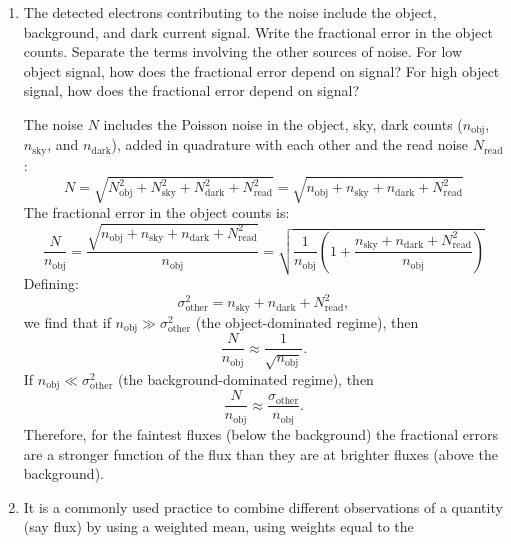 \begin{enumerate}
\item The detected electrons contributing to the noise include the
object, background, and dark current signal. Write the fractional
error in the object counts. Separate the terms involving the other
sources of noise. For low object signal, how does the fractional error
depend on signal? For high object signal, how does the fractional
error depend on signal?

\begin{answer}
The noise $N$ includes the Poisson noise in the object, sky, dark
counts ($n_\mathrm{obj}$, $n_\mathrm{sky}$, and $n_\mathrm{dark}$),
added in quadrature with each other and the read noise
$N_\mathrm{read}$:
\begin{equation}
\label{ }
N
= \sqrt{N_\mathrm{obj}^2+N_\mathrm{sky}^2+N_\mathrm{dark}^2+N_\mathrm{read}^2}=\sqrt{n_\mathrm{obj}+n_\mathrm{sky}+n_\mathrm{dark}+N_\mathrm{read}^2}
\end{equation}
The fractional error in the object counts is:
\begin{equation}
\label{ }
\frac{N}{n_\mathrm{obj}}=\frac{\sqrt{n_\mathrm{obj}+n_\mathrm{sky}+n_\mathrm{dark}+N_\mathrm{read}^2}}{n_\mathrm{obj}}
= \sqrt{\frac{1}{n_\mathrm{obj}}\left(1+
\frac{n_\mathrm{sky}+n_\mathrm{dark}+N_\mathrm{read}^2}{n_\mathrm{obj}}\right)}
\end{equation}
Defining:
\begin{equation}
\sigma_\mathrm{other}^2 =
n_\mathrm{sky}+n_\mathrm{dark}+N_\mathrm{read}^2,
\end{equation}
we find that if $n_\mathrm{obj}\gg \sigma_\mathrm{other}^2$ (the
object-dominated regime), then
\begin{equation}
\frac{N}{n_\mathrm{obj}} \approx \frac{1}{\sqrt{n_\mathrm{obj}}}.
\end{equation}
If $n_\mathrm{obj}\ll \sigma_\mathrm{other}^2$ (the
background-dominated regime), then
\begin{equation}
\frac{N}{n_\mathrm{obj}} \approx \frac{\sigma_\mathrm{other}}{n_\mathrm{obj}}.
\end{equation}
Therefore, for the faintest fluxes (below the background) the
fractional errors are a stronger function of the flux than they are at
brighter fluxes (above the background).
\end{answer}
\item It is a commonly used practice to combine different observations
of a quantity (say flux) by using a weighted mean, using weights equal to the

\end{enumerate}
